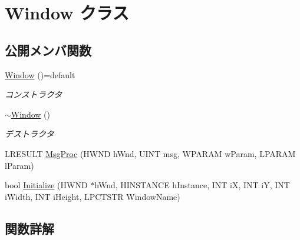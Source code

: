 \hypertarget{class_window}{}\section{Window クラス}
\label{class_window}
\subsection*{公開メンバ関数}
\begin{DoxyCompactItemize}
\item 
\hyperlink{class_window_a6cbfa660b1af1f7020fc63dce78aabad}{Window} ()=default\hypertarget{class_window_a6cbfa660b1af1f7020fc63dce78aabad}{}\label{class_window_a6cbfa660b1af1f7020fc63dce78aabad}

\begin{DoxyCompactList}\small\item\em コンストラクタ \end{DoxyCompactList}\item 
\hyperlink{class_window_a254ab61160c1cd5eaa46cc0475bb7a06}{$\sim$\+Window} ()\hypertarget{class_window_a254ab61160c1cd5eaa46cc0475bb7a06}{}\label{class_window_a254ab61160c1cd5eaa46cc0475bb7a06}

\begin{DoxyCompactList}\small\item\em デストラクタ \end{DoxyCompactList}\item 
L\+R\+E\+S\+U\+LT \hyperlink{class_window_ad4efa5601904d6c96a9411aadd8cfddd}{Msg\+Proc} (H\+W\+ND h\+Wnd, U\+I\+NT msg, W\+P\+A\+R\+AM w\+Param, L\+P\+A\+R\+AM l\+Param)
\item 
bool \hyperlink{class_window_a1a720138b95e41699828edd23227b047}{Initialize} (H\+W\+ND $\ast$h\+Wnd, H\+I\+N\+S\+T\+A\+N\+CE h\+Instance, I\+NT iX, I\+NT iY, I\+NT i\+Width, I\+NT i\+Height, L\+P\+C\+T\+S\+TR Window\+Name)
\end{DoxyCompactItemize}


\subsection{関数詳解}

